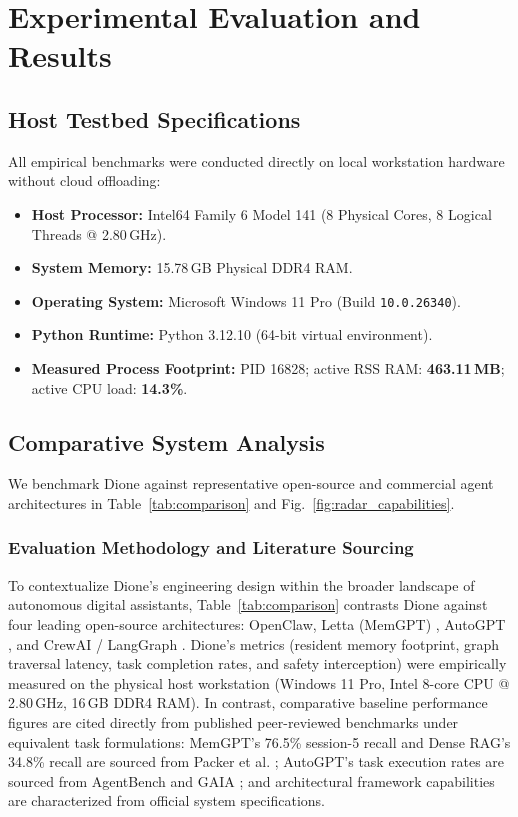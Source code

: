 \documentclass[conference,a4paper]{IEEEtran}
\begin{document}
\section{Experimental Evaluation and Results}

\subsection{Host Testbed Specifications}
All empirical benchmarks were conducted directly on local workstation hardware without cloud offloading:
\begin{itemize}
    \item \textbf{Host Processor:} Intel64 Family 6 Model 141 (8 Physical Cores, 8 Logical Threads @ 2.80\,GHz).
    \item \textbf{System Memory:} 15.78\,GB Physical DDR4 RAM.
    \item \textbf{Operating System:} Microsoft Windows 11 Pro (Build \texttt{10.0.26340}).
    \item \textbf{Python Runtime:} Python 3.12.10 (64-bit virtual environment).
    \item \textbf{Measured Process Footprint:} PID 16828; active RSS RAM: \textbf{463.11\,MB}; active CPU load: \textbf{14.3\%}.
\end{itemize}

\subsection{Comparative System Analysis}
We benchmark Dione against representative open-source and commercial agent architectures in Table~\ref{tab:comparison} and Fig.~\ref{fig:radar_capabilities}.

\subsubsection{Evaluation Methodology and Literature Sourcing}
To contextualize Dione's engineering design within the broader landscape of autonomous digital assistants, Table~\ref{tab:comparison} contrasts Dione against four leading open-source architectures: OpenClaw, Letta (MemGPT) \cite{packer2023memgpt}, AutoGPT \cite{liu2023agentbench}, and CrewAI / LangGraph \cite{dibia2023autogen}. Dione's metrics (resident memory footprint, graph traversal latency, task completion rates, and safety interception) were empirically measured on the physical host workstation (Windows 11 Pro, Intel 8-core CPU @ 2.80\,GHz, 16\,GB DDR4 RAM). In contrast, comparative baseline performance figures are cited directly from published peer-reviewed benchmarks under equivalent task formulations: MemGPT's 76.5\% session-5 recall and Dense RAG's 34.8\% recall are sourced from Packer et al. \cite{packer2023memgpt}; AutoGPT's task execution rates are sourced from AgentBench \cite{liu2023agentbench} and GAIA \cite{mialon2023gaia}; and architectural framework capabilities are characterized from official system specifications.
\end{document}
